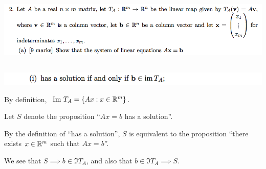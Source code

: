 \documentclass[12pt]{article}
\begin{document}
~\\
\subsection*{}  %
\begin{mdframed}
\includegraphics[width=400pt]{img/oxford-prelims-2017-A-2-1.png}
\end{mdframed}

\subsection*{}  %
\begin{mdframed}
\includegraphics[width=400pt]{img/oxford-prelims-2017-A-2-1-1.png}
\end{mdframed}

By definition,  $~\text{Im}~ T_A = \{Ax: x \in \mathbb{R}^m\}$.

Let $S$ denote the proposition ``$Ax = b$ has a solution''.

By the definition of ``has a solution'', $S$ is equivalent to the proposition
``there exists $x \in \mathbb{R}^m$ such that $Ax = b$''.

We see that $S \implies b \in \Im T_A$, and also that $b \in \Im T_A \implies S$.






\end{document}
